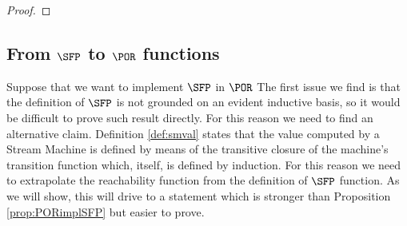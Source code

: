 \begin{conditional}{\notappendix}
\begin{proof}
  \end{proof}









\end{conditional}










\subsection{From $\SFP$ to $\POR$ functions}
\label{sec:SFPtoPOR}


\begin{conditional}{\notappendix}
  Suppose that we want to implement $\SFP$ in $\POR$
  The first issue we find is that
  the definition of $\SFP$ is not grounded on an evident inductive basis, so
  it would be difficult to prove such result directly.
  For this reason we need to find an alternative
  claim. Definition \ref{def:smval} states that the value computed by a
  Stream Machine is defined by means of the transitive closure of the machine's
  transition function which, itself, is defined by induction.
  For this reason we need to extrapolate the reachability function from the
  definition of $\SFP$ function. As we will show, this will drive
  to a statement which is
  stronger than Proposition \ref{prop:PORimplSFP} but easier to prove.


\end{conditional}

